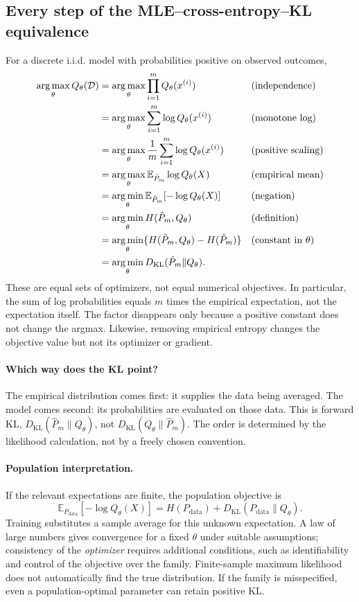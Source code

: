 \subsection{Every step of the MLE--cross-entropy--KL equivalence}
For a discrete i.i.d. model with probabilities positive on observed outcomes,
\begin{align}
\operatorname*{arg\,max}_\theta Q_\theta(\mathcal D)
&=\operatorname*{arg\,max}_\theta\prod_{i=1}^m Q_\theta(x^{(i)})
&&\text{(independence)}\notag\\
&=\operatorname*{arg\,max}_\theta\sum_{i=1}^m\log Q_\theta(x^{(i)})
&&\text{(monotone log)}\notag\\
&=\operatorname*{arg\,max}_\theta\frac1m\sum_{i=1}^m\log Q_\theta(x^{(i)})
&&\text{(positive scaling)}\notag\\
&=\operatorname*{arg\,max}_\theta\mathbb E_{\hat P_m}\log Q_\theta(X)
&&\text{(empirical mean)}\notag\\
&=\operatorname*{arg\,min}_\theta\mathbb E_{\hat P_m}[-\log Q_\theta(X)]
&&\text{(negation)}\notag\\
&=\operatorname*{arg\,min}_\theta H(\hat P_m,Q_\theta)
&&\text{(definition)}\notag\\
&=\operatorname*{arg\,min}_\theta\{H(\hat P_m,Q_\theta)-H(\hat P_m)\}
&&\text{(constant in $\theta$)}\notag\\
&=\operatorname*{arg\,min}_\theta D_{\mathrm{KL}}(\hat P_m\|Q_\theta).
\label{eq:info12-mlechain}
\end{align}
These are equal sets of optimizers, not equal numerical objectives.
In particular, the sum of log probabilities equals $m$ times the empirical
expectation, not the expectation itself. The factor disappears only because a
positive constant does not change the argmax. Likewise, removing empirical
entropy changes the objective value but not its optimizer or gradient.

\paragraph{Which way does the KL point?}
The empirical distribution comes first: it supplies the data being averaged.
The model comes second: its probabilities are evaluated on those data.
This is forward KL, $D_{\mathrm{KL}}(\hat P_m\|Q_\theta)$, not
$D_{\mathrm{KL}}(Q_\theta\|\hat P_m)$. The order is determined by the likelihood
calculation, not by a freely chosen convention.

\paragraph{Population interpretation.}
If the relevant expectations are finite, the population objective is
\[
\mathbb E_{P_{\mathrm{data}}}[-\log Q_\theta(X)]
=H(P_{\mathrm{data}})+D_{\mathrm{KL}}(P_{\mathrm{data}}\|Q_\theta).
\]
Training substitutes a sample average for this unknown expectation. A law of
large numbers gives convergence for a fixed $\theta$ under suitable assumptions;
consistency of the \emph{optimizer} requires additional conditions, such as
identifiability and control of the objective over the family. Finite-sample
maximum likelihood does not automatically find the true distribution.
If the family is misspecified, even a population-optimal parameter can retain
positive KL.

